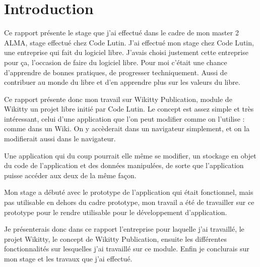 \section*{Introduction}

Ce rapport présente le stage que j'ai effectué dans le cadre de mon master 2
ALMA, stage effectué chez Code Lutin. J'ai effectué mon stage chez Code Lutin, une
entreprise qui fait du logiciel libre. J'avais choisi justement cette entreprise
pour ça, l'occasion de faire du logiciel libre. Pour moi c'était une chance 
d'apprendre de bonnes pratiques, de progresser techniquement. Aussi de contribuer au 
monde du libre et d'en apprendre plus sur les valeurs du libre.

Ce rapport présente donc mon travail sur Wikitty Publication, module de Wikitty
un projet libre initié par Code Lutin. Le concept est assez simple et très 
intéressant, celui d'une application que l'on peut modifier comme on l'utilise :
comme dans un Wiki. On y accèderait dans un navigateur simplement, et on la modifierait aussi
dans le navigateur.

Une application qui du coup pourrait elle même se modifier, un stockage en objet
du code de l'application et des données manipulées, de sorte que l'application 
puisse accéder aux deux de la même façon.

Mon stage a débuté avec le prototype de l'application qui était fonctionnel,
mais pas utilisable en dehors du cadre prototype, mon travail a été de travailler
sur ce prototype pour le rendre utilisable pour le développement d'application.

Je présenterais donc dans ce rapport l'entreprise pour laquelle j'ai travaillé,
le projet Wikitty, le concept de Wikitty Publication, ensuite les différentes
fonctionnalités sur lesquelles j'ai travaillé sur ce module.
Enfin je conclurais sur mon stage et les travaux que j'ai effectué.

